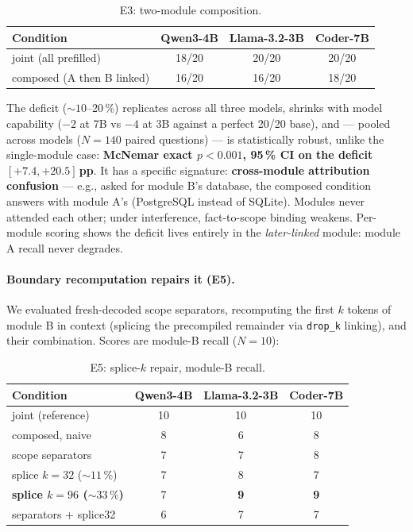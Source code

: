 \documentclass[11pt]{article}
\newcommand{\code}[1]{\texttt{#1}}
\begin{document}
\begin{table}[h]
  \centering\small
  \caption{E3: two-module composition.}
  \begin{tabular}{lccc}
    \toprule
    Condition & Qwen3-4B & Llama-3.2-3B & Coder-7B \\
    \midrule
    joint (all prefilled) & 18/20 & 20/20 & 20/20 \\
    composed (A then B linked) & 16/20 & 16/20 & 18/20 \\
    \bottomrule
  \end{tabular}
\end{table}

The deficit (${\sim}10$--20\,\%) replicates across all three models, shrinks with model capability ($-2$ at 7B vs $-4$ at 3B against a perfect 20/20 base), and --- pooled across models ($N=140$ paired questions) --- is statistically robust, unlike the single-module case: \textbf{McNemar exact $p<0.001$, 95\,\% CI on the deficit $[+7.4, +20.5]$\,pp}. It has a specific signature: \textbf{cross-module attribution confusion} --- e.g., asked for module B's database, the composed condition answers with module A's (PostgreSQL instead of SQLite). Modules never attended each other; under interference, fact-to-scope binding weakens. Per-module scoring shows the deficit lives entirely in the \emph{later-linked} module: module A recall never degrades.

\paragraph{Boundary recomputation repairs it (E5).}
We evaluated fresh-decoded scope separators, recomputing the first $k$ tokens of module B in context (splicing the precompiled remainder via \code{drop\_k} linking), and their combination. Scores are module-B recall ($N{=}10$):

\begin{table}[h]
  \centering\small
  \caption{E5: splice-$k$ repair, module-B recall.}
  \begin{tabular}{lccc}
    \toprule
    Condition & Qwen3-4B & Llama-3.2-3B & Coder-7B \\
    \midrule
    joint (reference) & 10 & 10 & 10 \\
    composed, naive & 8 & 6 & 8 \\
    scope separators & 7 & 7 & 8 \\
    splice $k{=}32$ (${\sim}11\,\%$) & 7 & 8 & 7 \\
    \textbf{splice $k{=}96$ (${\sim}33\,\%$)} & 7 & \textbf{9} & \textbf{9} \\
    separators + splice32 & 6 & 7 & 7 \\
    \bottomrule
  \end{tabular}
\end{table}
\end{document}
